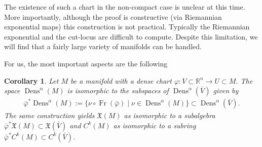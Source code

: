 \documentclass[letterpaper, 10 pt, conference]{ieeeconf}
\newcommand{\R}{\mathbb{R}}
\newtheorem{cor}[thm]{Corollary}
\DeclareMathOperator{\Fr}{Fr}
\DeclareMathOperator{\Dens}{Dens}
\begin{document}
  The existence of such a chart in the non-compact case is unclear
  at this time.  More importantly,
  although the proof is constructive (via Riemannian exponential maps)
  this construction is not practical.
  Typically the Riemannian exponential and the cut-locus are difficult
  to compute. Despite this limitation,
  we will find that a fairly large variety of manifolds can be handled.

  For us, the most important aspects are the following
  \begin{cor}\label{prop:functions_spaces}
    Let $M$ be a manifold with a dense chart 
    $\varphi:V \subset \R^n \to U \subset M$.
    The space $\Dens^\alpha(M)$ is isomorphic to the subspaces of 
    $\Dens^\alpha(\bar{V})$ given by
    \begin{align*}
      \bar{\varphi}^*\Dens^\alpha(M) := \{ \nu \circ \Fr(\bar{\varphi})
      \mid \nu \in \Dens^\alpha(M) \} \subset \Dens^\alpha( \bar{V}).
    \end{align*}
    The same construction yields $\mathfrak{X}(M)$ as isomorphic
    to a subalgebra 
    $\bar{\varphi}^* \mathfrak{X}(M) \subset \mathfrak{X}(\bar{V})$
    and $C^k(M)$ as isomorphic to a subring
    $\bar{\varphi}^* C^k(M) \subset C^k(\bar{V})$.
  \end{cor}
\end{document}
